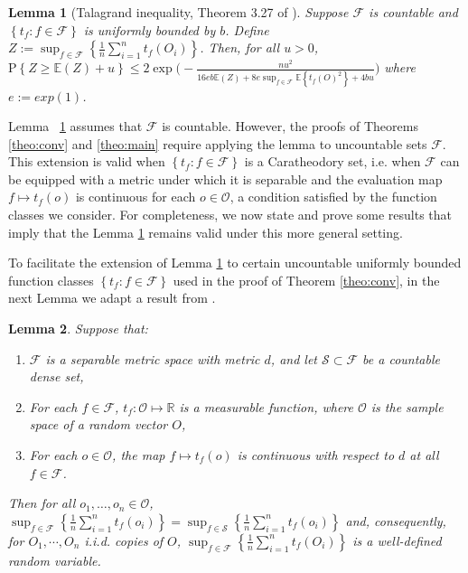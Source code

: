 \documentclass[twoside,11pt]{article}
\newtheorem{lemma}{Lemma}
\newcommand{\mc}{\mathcal}
\begin{document}
\begin{lemma}[Talagrand inequality, Theorem 3.27 of \cite{wainwright2019high}]
    Suppose $\mc{F}$ is countable and $\left\{t_f:f\in\mc{F}\right\}$ is uniformly bounded by $b$. Define $Z:=\sup_{f\in\mc{F}}\left\{\frac{1}{n}\sum_{i=1}^nt_f(O_i)\right\}$. Then, for all $u>0$, $\text{P}\left\{Z\ge\mathbb{E}(Z)+u\right\}\le2\exp\Big(-\frac{nu^2}{16eb\mathbb{E}(Z)+8e\sup_{f\in\mc{F}}\mathbb{E}\left\{t_f(O)^2\right\}+4bu}\Big)$
    where $e:=exp(1)$.\label{lemma:talagrand}
\end{lemma}


Lemma ~\ref{lemma:talagrand} assumes that $\mc{F}$ is countable. However, the proofs of Theorems \ref{theo:conv} and \ref{theo:main} require applying the lemma to  uncountable sets $\mc{F}$. This extension is valid when $\left\{t_f:f\in\mc{F}\right\}$ is a Caratheodory set, i.e. when $\mc{F}$ can be equipped with a metric under which it is separable and the evaluation map $f \mapsto t_f(o)$ is continuous for each $o \in \mc{O}$, a condition satisfied by the function classes we consider. For completeness, we now state and prove some results that imply that the Lemma \ref{lemma:talagrand} remains valid under this more general setting.






To facilitate the extension of Lemma \ref{lemma:talagrand} to certain uncountable uniformly bounded function classes $\left\{t_f:f\in\mc{F}\right\}$ used in the proof of Theorem \ref{theo:conv}, in the next Lemma we adapt a result from \cite{steinwart2008support}.

\begin{lemma}
Suppose that:
\begin{enumerate}
    \item $\mc{F}$ is a separable metric space with metric $d$, and let $\mc{S}\subset\mc{F}$ be a countable dense set,
    \item For each $f\in\mc{F}$, $t_f:\mc{O}\mapsto\mathbb{R}$ is a measurable function,  where $\mc{O}$ is the sample space of a random vector $O$,
    \item For each $o\in\mc{O}$, the map $f\mapsto t_f(o)$ is continuous with respect to $d$ at all $f \in \mc{F}$.
\end{enumerate}
Then for all $o_1,\dots,o_n\in\mc{O}$, $\sup_{f\in\mc{F}}\left\{\frac{1}{n}\sum_{i=1}^nt_f(o_i) \right \} = \sup_{f\in\mc{S}}\left\{\frac{1}{n}\sum_{i=1}^nt_f(o_i)\right\}$ and, consequently, for $O_1,\cdots,O_n$ i.i.d. copies of $O$, $\sup_{f\in\mc{F}}\left\{\frac{1}{n}\sum_{i=1}^nt_f(O_i)\right\}$ is a well-defined random variable.
    \label{lemma:countable}
\end{lemma}
\end{document}
